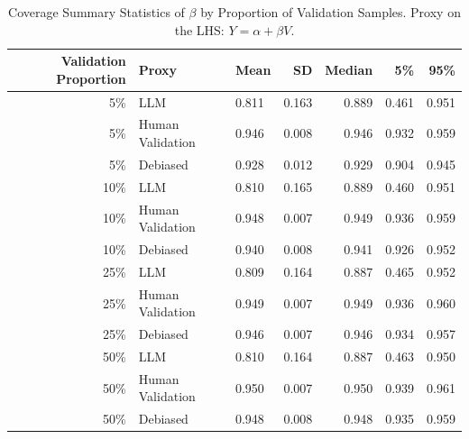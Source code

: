 \begin{table}

\caption{Coverage Summary Statistics of $\beta$ by Proportion of Validation Samples. Proxy on the LHS: $Y = \alpha + \beta V$.}
\centering
\begin{tabular}[t]{rllrrrr}
\toprule
Validation Proportion & Proxy & Mean & SD & Median & 5\% & 95\%\\
\midrule
5\% & LLM & 0.811 & 0.163 & 0.889 & 0.461 & 0.951\\
5\% & Human Validation & 0.946 & 0.008 & 0.946 & 0.932 & 0.959\\
5\% & Debiased & 0.928 & 0.012 & 0.929 & 0.904 & 0.945\\
10\% & LLM & 0.810 & 0.165 & 0.889 & 0.460 & 0.951\\
10\% & Human Validation & 0.948 & 0.007 & 0.949 & 0.936 & 0.959\\
10\% & Debiased & 0.940 & 0.008 & 0.941 & 0.926 & 0.952\\
25\% & LLM & 0.809 & 0.164 & 0.887 & 0.465 & 0.952\\
25\% & Human Validation & 0.949 & 0.007 & 0.949 & 0.936 & 0.960\\
25\% & Debiased & 0.946 & 0.007 & 0.946 & 0.934 & 0.957\\
50\% & LLM & 0.810 & 0.164 & 0.887 & 0.463 & 0.950\\
50\% & Human Validation & 0.950 & 0.007 & 0.950 & 0.939 & 0.961\\
50\% & Debiased & 0.948 & 0.008 & 0.948 & 0.935 & 0.959\\
\bottomrule
\end{tabular}
\end{table}

